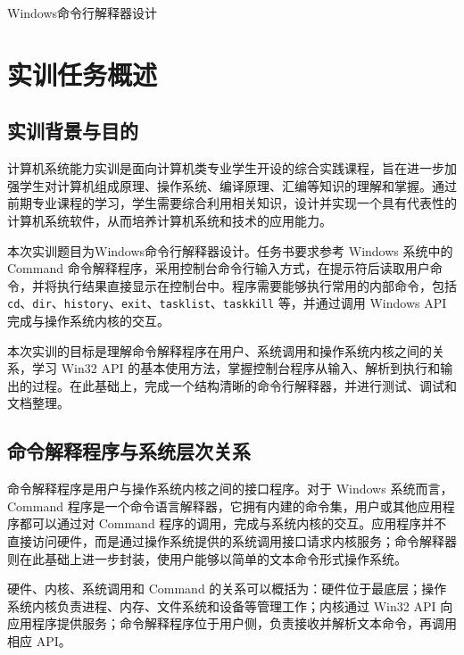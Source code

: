 \documentclass[UTF8,a4paper,12pt,fontset=none]{ctexart}
\providecommand{\heiti}{\CJKfamily{zhhei}}
\begin{document}
\begin{center}
    {\heiti{} Windows命令行解释器设计}
\end{center}

\section{实训任务概述}

\subsection{实训背景与目的}

计算机系统能力实训是面向计算机类专业学生开设的综合实践课程，旨在进一步加强学生对计算机组成原理、操作系统、编译原理、汇编等知识的理解和掌握\cite{tang-jizu,tan-os}。通过前期专业课程的学习，学生需要综合利用相关知识，设计并实现一个具有代表性的计算机系统软件，从而培养计算机系统和技术的应用能力。

本次实训题目为Windows命令行解释器设计。任务书要求参考 Windows 系统中的 Command 命令解释程序，采用控制台命令行输入方式，在提示符后读取用户命令，并将执行结果直接显示在控制台中。程序需要能够执行常用的内部命令，包括 \texttt{cd}、\texttt{dir}、\texttt{history}、\texttt{exit}、\texttt{tasklist}、\texttt{taskkill} 等，并通过调用 Windows API 完成与操作系统内核的交互\cite{ms-win32-api}。

本次实训的目标是理解命令解释程序在用户、系统调用和操作系统内核之间的关系，学习 Win32 API 的基本使用方法，掌握控制台程序从输入、解析到执行和输出的过程。在此基础上，完成一个结构清晰的命令行解释器，并进行测试、调试和文档整理。

\subsection{命令解释程序与系统层次关系}

命令解释程序是用户与操作系统内核之间的接口程序\cite{tan-os}。对于 Windows 系统而言，Command 程序是一个命令语言解释器，它拥有内建的命令集，用户或其他应用程序都可以通过对 Command 程序的调用，完成与系统内核的交互。应用程序并不直接访问硬件，而是通过操作系统提供的系统调用接口请求内核服务；命令解释器则在此基础上进一步封装，使用户能够以简单的文本命令形式操作系统。

硬件、内核、系统调用和 Command 的关系可以概括为：硬件位于最底层；操作系统内核负责进程、内存、文件系统和设备等管理工作；内核通过 Win32 API 向应用程序提供服务\cite{ms-win32-api}；命令解释程序位于用户侧，负责接收并解析文本命令，再调用相应 API。
\end{document}
